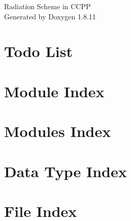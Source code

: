 \documentclass[twoside]{book}
\newcommand{\+}{\discretionary{\mbox{\scriptsize$\hookleftarrow$}}{}{}}
\newcommand{\clearemptydoublepage}{%
  \newpage{\pagestyle{empty}\cleardoublepage}%
}
\begin{document}
\hypersetup{pageanchor=false,
             bookmarksnumbered=true,
             pdfencoding=unicode
            }
\begin{titlepage}
\vspace*{7cm}
\begin{center}%
{\Large Radiation Scheme in C\+C\+PP }\\
\vspace*{1cm}
{\large Generated by Doxygen 1.8.11}\\
\end{center}
\end{titlepage}
\clearemptydoublepage
\tableofcontents
\clearemptydoublepage
{}
\hypersetup{pageanchor=true}

\chapter{Todo List}
\label{todo}
\hypertarget{todo}{}

\chapter{Module Index}

\chapter{Modules Index}

\chapter{Data Type Index}

\chapter{File Index}

\end{document}
